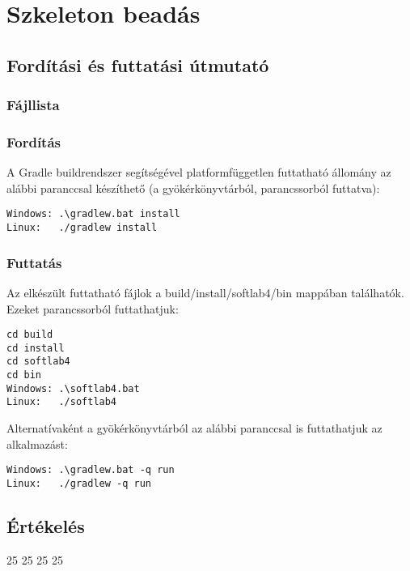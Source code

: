 %
\chapter{Szkeleton beadás}

\thispagestyle{fancy}

\section{Fordítási és futtatási útmutató}

\subsection{Fájllista}


\subsection{Fordítás}

A Gradle buildrendszer segítségével platformfüggetlen futtatható állomány az alábbi paranccsal készíthető (a gyökérkönyvtárból, parancssorból futtatva):
\lstset{escapeinside=`', xleftmargin=10pt, frame=single, basicstyle=\ttfamily\footnotesize, language=sh}
\begin{lstlisting}
Windows: .\gradlew.bat install
Linux:   ./gradlew install
\end{lstlisting}

\subsection{Futtatás}
Az elkészült futtatható fájlok a build/install/softlab4/bin mappában találhatók. 
Ezeket parancssorból futtathatjuk:
\lstset{escapeinside=`', xleftmargin=10pt, frame=single, basicstyle=\ttfamily\footnotesize, language=sh}
\begin{lstlisting}
cd build
cd install
cd softlab4
cd bin
Windows: .\softlab4.bat 
Linux:   ./softlab4
\end{lstlisting}

Alternatívaként a gyökérkönyvtárból az alábbi paranccsal is futtathatjuk az alkalmazást:
\lstset{escapeinside=`', xleftmargin=10pt, frame=single, basicstyle=\ttfamily\footnotesize, language=sh}
\begin{lstlisting}
Windows: .\gradlew.bat -q run
Linux:   ./gradlew -q run
\end{lstlisting}

\section{Értékelés}

\begin{ertekeles}
{25}        %
{25}
{25}
{25}
\end{ertekeles}

